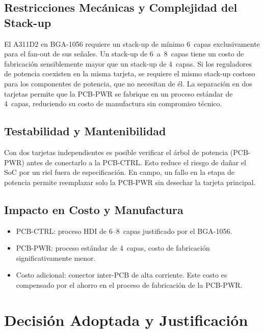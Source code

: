 \subsection{Restricciones Mecánicas y Complejidad del Stack-up}

El A311D2 en BGA-1056 requiere un stack-up de mínimo 6~capas exclusivamente para
el fan-out de sus señales. Un stack-up de 6~a~8~capas tiene un costo
de fabricación sensiblemente mayor que un stack-up de 4~capas. Si los reguladores
de potencia coexisten en la misma tarjeta, se requiere el mismo stack-up costoso
para los componentes de potencia, que no necesitan de él. La separación en dos
tarjetas permite que la PCB-PWR se fabrique en un proceso estándar de 4~capas,
reduciendo su costo de manufactura sin compromiso técnico.

\subsection{Testabilidad y Mantenibilidad}

Con dos tarjetas independientes es posible verificar el árbol de potencia (PCB-PWR)
antes de conectarlo a la PCB-CTRL. Esto reduce el riesgo de dañar el SoC por un
riel fuera de especificación. En campo, un fallo en la etapa de potencia permite
reemplazar solo la PCB-PWR sin desechar la tarjeta principal.

\subsection{Impacto en Costo y Manufactura}

\begin{itemize}
  \item PCB-CTRL: proceso HDI de 6--8~capas justificado por el BGA-1056.
  \item PCB-PWR: proceso estándar de 4~capas, costo de fabricación significativamente
    menor.
  \item Costo adicional: conector inter-PCB de alta corriente. Este costo es compensado
    por el ahorro en el proceso de fabricación de la PCB-PWR.
\end{itemize}

\section{Decisión Adoptada y Justificación}
\label{sec:part_decision}


